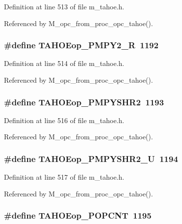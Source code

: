 Definition at line 513 of file m\_\-tahoe.h.

Referenced by M\_\-opc\_\-from\_\-proc\_\-opc\_\-tahoe().
\subsubsection{\setlength{\rightskip}{0pt plus 5cm}\#define TAHOEop\_\-PMPY2\_\-R~1192}\label{m__tahoe_8h_954505f40564b152dd53590cb95c75fe}




Definition at line 514 of file m\_\-tahoe.h.

Referenced by M\_\-opc\_\-from\_\-proc\_\-opc\_\-tahoe().
\subsubsection{\setlength{\rightskip}{0pt plus 5cm}\#define TAHOEop\_\-PMPYSHR2~1193}\label{m__tahoe_8h_fc80afdf95e1c849ac292fec9354f36d}




Definition at line 516 of file m\_\-tahoe.h.

Referenced by M\_\-opc\_\-from\_\-proc\_\-opc\_\-tahoe().
\subsubsection{\setlength{\rightskip}{0pt plus 5cm}\#define TAHOEop\_\-PMPYSHR2\_\-U~1194}\label{m__tahoe_8h_d105faf366a099cd675d59fae4ba7977}




Definition at line 517 of file m\_\-tahoe.h.

Referenced by M\_\-opc\_\-from\_\-proc\_\-opc\_\-tahoe().
\subsubsection{\setlength{\rightskip}{0pt plus 5cm}\#define TAHOEop\_\-POPCNT~1195}\label{m__tahoe_8h_09b94cd32a3ce14c4b62e7da81aca6e4}




